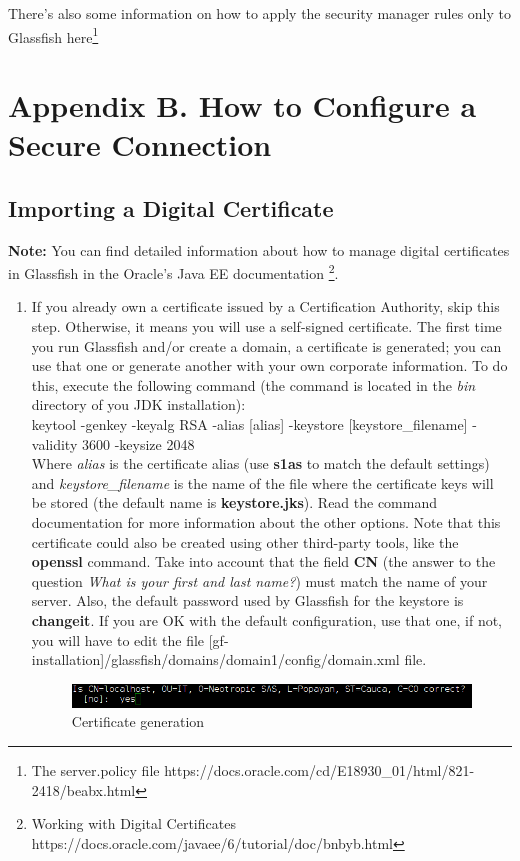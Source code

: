 \documentclass[a4paper]{article}
\begin{document}
\begin{appendices}
			There's also some information on how to apply the security manager rules only to Glassfish here\footnote{The server.policy file https://docs.oracle.com/cd/E18930\_01/html/821-2418/beabx.html}
			
			\newpage
			\appendix
			\section{Appendix B. How to Configure a Secure Connection} \label{app:AppendixB}
				\subsection{Importing a Digital Certificate}
				\textbf{Note:} You can find detailed information about how to manage digital certificates in Glassfish in the Oracle's Java EE documentation \footnote{Working with Digital Certificates https://docs.oracle.com/javaee/6/tutorial/doc/bnbyb.html}. \\
				
				\begin{enumerate}
					\item If you already own a certificate issued by a Certification Authority, skip this step. Otherwise, it means you will use a self-signed certificate. The first time you run Glassfish and/or create a domain, a certificate is generated; you can use that one or generate another with your own corporate information. To do this, execute the following command (the command is located in the \textit{bin} directory of you JDK installation):\\
					
					\small keytool -genkey -keyalg RSA -alias [alias] -keystore [keystore\_filename] -validity 3600 -keysize 2048\\
					
					Where \textit{alias} is the certificate alias (use \textbf{s1as} to match the default settings) and \textit{keystore\_filename} is the name of the file where the certificate keys will be stored (the default name is \textbf{keystore.jks}). Read the command documentation for more information about the other options. Note that this certificate could also be created using other third-party tools, like the \textbf{openssl} command. Take into account that the field \textbf{CN} (the answer to the question \textit{What is your first and last name?}) must match the name of your server. Also, the default password used by Glassfish for the keystore is \textbf{changeit}. If you are OK with the default configuration, use that one, if not, you will have to edit the file [gf-installation]/glassfish/domains/domain1/config/domain.xml file.
					\begin{figure}[h!]
						\centering
						\includegraphics[width=0.7\linewidth]{img/certificate_generation.png} 	
						\caption{Certificate generation}
						\label{fig:certificate_generation}
					\end{figure}
					

\end{enumerate}
\end{appendices}
\end{document}
